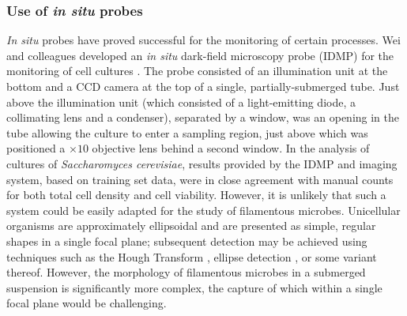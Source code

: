 \subsubsection{Use of \textit{in situ} probes}

\emph{In situ} probes have proved successful for the monitoring of certain processes. Wei and colleagues developed an \emph{in situ} dark-field microscopy probe (IDMP) for the monitoring of cell cultures \cite{wei2007}. The probe consisted of an illumination unit at the bottom and a CCD camera at the top of a single, partially-submerged tube. Just above the illumination unit (which consisted of a light-emitting diode, a collimating lens and a condenser), separated by a window, was an opening in the tube allowing the culture to enter a sampling region, just above which was positioned a $\times 10$ objective lens behind a second window. In the analysis of cultures of \emph{Saccharomyces cerevisiae}, results provided by the IDMP and imaging system, based on training set data, were in close agreement with manual counts for both total cell density and cell viability. However, it is unlikely that such a system could be easily adapted for the study of filamentous microbes. Unicellular organisms are approximately ellipsoidal and are presented as simple, regular shapes in a single focal plane; subsequent detection may be achieved using techniques such as the Hough Transform \cite{hough1959}, ellipse detection \cite{kharma2007}, or some variant thereof. However, the morphology of filamentous microbes in a submerged suspension is significantly more complex, the capture of which within a single focal plane would be challenging.

